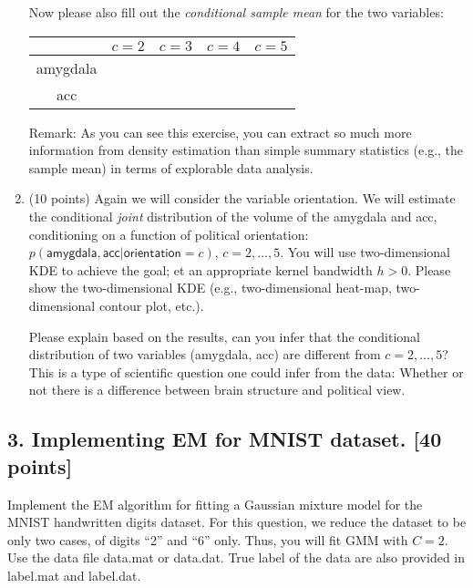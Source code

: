 \documentclass[12pt]{article}
\begin{document}
\begin{enumerate}[label*=\arabic*.]
Now please also fill out the {\it conditional sample mean} for the two variables: %
\begin{center}
\begin{tabular}{|c|c|c|c|c|}
\hline
& $c = 2$ & $c = 3$ & $c = 4$ & $c = 5$ \\\hline
\textsf{amygdala} & & & & \\\hline
\textsf{acc} & & & & \\\hline
\end{tabular}
\end{center}
Remark: As you can see this exercise, you can extract so much more information from density estimation than simple summary statistics (e.g., the sample mean) in terms of explorable data analysis.  
 
 \item (10  points) Again we will consider the variable \textsf{orientation}. We will estimate the conditional {\it joint} distribution of the volume of the \textsf{amygdala} and \textsf{acc}, conditioning on  a function of political \textsf{orientation}: $p(\textsf{amygdala}, \textsf{acc}|\textsf{orientation}=c)$, $c = 2, \ldots, 5$. You will use two-dimensional KDE to achieve the goal; et an appropriate kernel bandwidth $h >0$. Please show the two-dimensional KDE (e.g., two-dimensional heat-map, two-dimensional contour plot, etc.). 
 
 Please explain based on the results, can you infer that the conditional distribution of two variables (\textsf{amygdala}, \textsf{acc}) are different from $c = 2, \ldots, 5$? This is a type of scientific question one could infer from the data: Whether or not there is a difference between brain structure and political view.
 
  
 \end{enumerate}
 

\subsection*{3. Implementing EM for MNIST dataset. [40 points]}

Implement the EM algorithm for fitting a Gaussian mixture model for the MNIST handwritten digits dataset. For this question, we reduce the dataset to be only two cases, of digits ``2'' and ``6'' only. Thus, you will fit GMM with $C = 2$. Use the data file \textsf{data.mat} or \textsf{data.dat}. True label of the data are also provided in \textsf{label.mat} and \textsf{label.dat}.
\\
\end{document}
